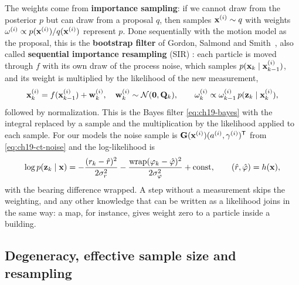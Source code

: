 The weights come from \textbf{importance sampling}: if we cannot draw from the posterior $p$ but can draw from a
proposal $q$, then samples $\mathbf{x}^{(i)} \sim q$ with weights $\omega^{(i)}
\propto p(\mathbf{x}^{(i)})/q(\mathbf{x}^{(i)})$ represent $p$. Done sequentially
with the motion model as the proposal, this is the \textbf{bootstrap
filter} of Gordon, Salmond and
Smith~\cite{gordon1993novel}, also called \textbf{sequential importance
resampling} (SIR)
\cite{arulampalam2002tutorial}: each particle is moved through $f$ with its
own draw of the process noise, which samples $p(\mathbf{x}_k \mid
\mathbf{x}_{k-1}^{(i)})$, and its weight is multiplied by the likelihood of the
new measurement,
\begin{equation}
  \mathbf{x}_k^{(i)} = f(\mathbf{x}_{k-1}^{(i)}) + \mathbf{w}_k^{(i)},\quad
  \mathbf{w}_k^{(i)} \sim \mathcal{N}(\mathbf{0}, \mathbf{Q}_k), \qquad
  \omega_k^{(i)} \propto \omega_{k-1}^{(i)}\, p(\mathbf{z}_k \mid \mathbf{x}_k^{(i)}),
  \label{eq:ch19-sir}
\end{equation}
followed by normalization. This is the Bayes filter \cref{eq:ch19-bayes}
with the integral replaced by a sample and the multiplication by the
likelihood applied to each sample. For our models the noise sample is
$\mathbf{G}(\mathbf{x}^{(i)})(a^{(i)}, \gamma^{(i)})^{\mathsf{T}}$ from \cref{eq:ch19-ct-noise}
and the log-likelihood is
\begin{equation}
  \log p(\mathbf{z}_k \mid \mathbf{x}) = -\frac{(r_k - \hat{r})^2}{2\sigma_r^2}
  - \frac{\operatorname{wrap}(\varphi_k - \hat{\varphi})^2}{2\sigma_\varphi^2}
  + \text{const}, \qquad (\hat{r}, \hat{\varphi}) = h(\mathbf{x}),
  \label{eq:ch19-loglik}
\end{equation}
with the bearing difference wrapped. A step without a measurement skips the
weighting, and any other knowledge that can be written as a likelihood joins
in the same way: a map, for instance, gives weight zero to a particle inside
a building.

\subsection{Degeneracy, effective sample size and resampling}
\label{sec:ch19-resampling}

